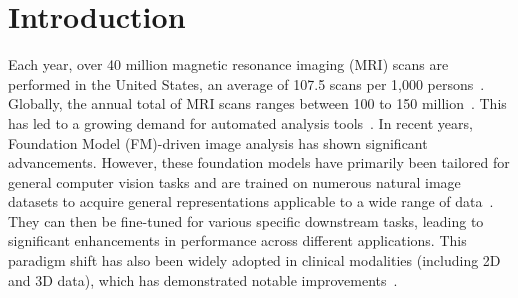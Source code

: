 \section{Introduction}
\label{sec:intro}
Each year, over 40 million magnetic resonance imaging (MRI) scans are performed in the United States, an average of 107.5 scans per 1,000 persons~\cite{oecd_mri_units_2023,shah2023review}. Globally, the annual total of MRI scans ranges between 100 to 150 million~\cite{mri_number_worldwide}. 
This has led to a growing demand for automated analysis tools~\cite{https://doi.org/10.1002/mp.16844}. In recent years, Foundation Model (FM)-driven image analysis has shown significant advancements. However, these foundation models have primarily been tailored for general computer vision tasks and are trained on numerous natural image datasets to acquire general representations applicable to a wide range of data~\cite{Caron_2021_ICCV,he2022masked,oquab2023dinov2}. They can then be fine-tuned for various specific downstream tasks, leading to significant enhancements in performance across different applications. This paradigm shift has also been widely adopted in clinical modalities (including 2D and 3D data), which has demonstrated notable improvements~\cite{moor2023foundation,chen2024towards,Zhao2024,Safari_2024}.

